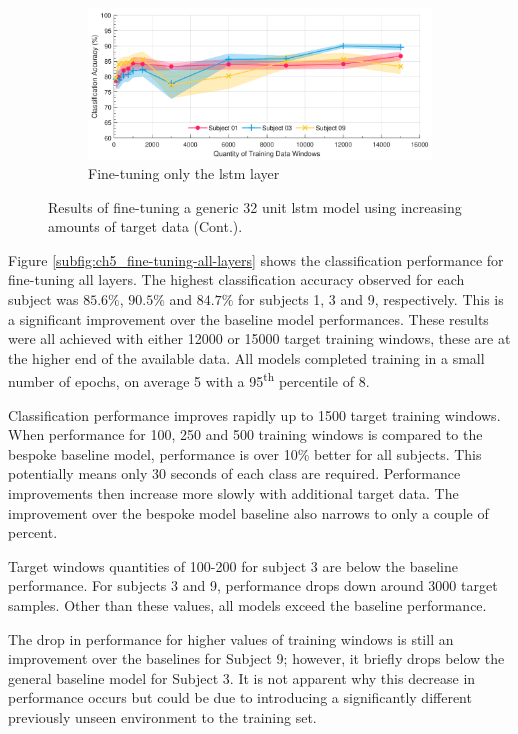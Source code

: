\begin{figure}[t]\ContinuedFloat
    \begin{subfigure}{\textwidth}
        \centering
        \includegraphics[width=\textwidth]{content/5-Personalisation/ch5_frozen_dense_layer_accuracy.pdf}
        \caption{Fine-tuning only the \acrshort{lstm} layer}
    \end{subfigure}
    \caption[]{Results of fine-tuning a generic 32 unit \acrshort{lstm} model using increasing amounts of target data (Cont.).}
\end{figure}

Figure \ref{subfig:ch5_fine-tuning-all-layers} shows the classification performance for fine-tuning all layers. The highest classification accuracy observed for each subject was $85.6\%$, $90.5\%$ and $84.7\%$ for subjects 1, 3 and 9, respectively. This is a significant improvement over the baseline model performances. These results were all achieved with either 12000 or 15000 target training windows, these are at the higher end of the available data. All models completed training in a small number of epochs, on average 5 with a 95\textsuperscript{th} percentile of 8.

Classification performance improves rapidly up to 1500 target training windows. When performance for 100, 250 and 500 training windows is compared to the bespoke baseline model, performance is over 10\% better for all subjects. This potentially means only 30 seconds of each class are required. Performance improvements then increase more slowly with additional target data. The improvement over the bespoke model baseline also narrows to only a couple of percent.

Target windows quantities of 100-200 for subject 3 are below the baseline performance. For subjects 3 and 9, performance drops down around 3000 target samples. Other than these values, all models exceed the baseline performance.

The drop in performance for higher values of training windows is still an improvement over the baselines for Subject 9; however, it briefly drops below the general baseline model for Subject 3. It is not apparent why this decrease in performance occurs but could be due to introducing a significantly different previously unseen environment to the training set.

